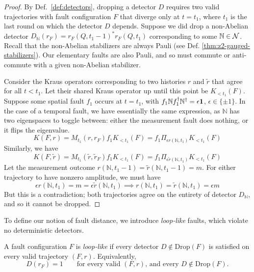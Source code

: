 \documentclass[11pt]{article}
\begin{document}
\begin{proof}
    By Def.~\ref{def:detectors}, dropping a detector $D$ requires two valid trajectories with fault configuration $F$ that diverge only at $t=t_1$, where $t_1$ is the last round on which the detector $D$ depends. Suppose we did drop a non-Abelian detector $D_{\mathbb{N}}(r_F) = r_F(Q, t_1-1)^*r_F(Q, t_1)$ corresponding to some $\mathbb{N} \in \mathcal{N}$. Recall that the non-Abelian stabilizers are always Pauli (see Def. \ref{thm:z2-gauged-stabilizers}). Our elementary faults are also Pauli, and so must commute or anti-commute with a given non-Abelian stabilizer. 
    
    Consider the Kraus operators corresponding to two histories $r$ and $\tilde{r}$ that agree for all $t < t_1$. Let their shared Kraus operator up until this point be $K_{< t_1}(F) $. Suppose some spatial fault $f_1$ occurs at $t = t_1$, with $f_1 \mathbb{N} f_1^\dagger \mathbb{N}^\dagger = \epsilon \mathbf{1}$, $\epsilon \in \{\pm 1\}$. In the case of a temporal fault, we have essentially the same expression, as $\mathbb{N}$ has two eigenspaces to toggle between: either the measurement fault does nothing, or it flips the eigenvalue. 
    \[
    K(F, r) = M_{t_1}(r, r_F)f_1 K_{< t_1}(F) = f_1 \Pi_{\epsilon r(\mathbb{N}, t_1)} K_{< t_1}(F) 
    \]
    Similarly, we have
    \[
    K(F, \tilde{r}) = M_{t_1}(\tilde{r}, \tilde{r}_F)f_1 K_{< t_1}(F) = f_1 \Pi_{\epsilon \tilde{r}(\mathbb{N}, t_1)} K_{< t_1}(F)
    \]
    Let the measurement outcome $r(\mathbb{N}, t_1-1) = \tilde{r}(\mathbb{N}, t_1-1) = m$. For either trajectory to have nonzero amplitude, we must have
    \[
    \epsilon r(\mathbb{N}, t_1) = m = \epsilon \tilde{r}(\mathbb{N}, t_1) \implies  r(\mathbb{N}, t_1) = \tilde{r}(\mathbb{N}, t_1) = \epsilon m
    \]
    But this is a contradiction; both trajectories agree on the entirety of detector $D_{\mathbb{N}}$, and so it cannot be dropped.
 
\end{proof}

To define our notion of fault distance, we introduce \emph{loop-like} faults, which violate no deterministic detectors. 

\begin{definition}
\label{def:loop-like-fault}
    A fault configuration $F$ is \emph{loop-like} if every detector $D\notin \mathrm{Drop}(F)$ is satisfied on every valid trajectory $(F,r)$.
    Equivalently,
    \[
    D(r_F) = 1\qquad \text{for every valid $(F,r)$, and every $D\notin \mathrm{Drop}(F)$.}
    \]
\end{definition}
\end{document}
